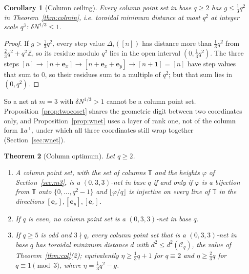 \documentclass[11pt]{amsart}
\newtheorem{theorem}{Theorem}
\newtheorem{corollary}[theorem]{Corollary}
\theoremstyle{definition}
\theoremstyle{plain}
\newcommand{\Z}{\mathbb{Z}}
\newcommand{\e}{\mathbf{e}}
\begin{document}
\begin{corollary}[Column ceiling]\label{cor:colceil}
Every column point set in base $q\ge2$ has $g\le\frac13q^2$ in Theorem~\ref{thm:colmin}, i.e. toroidal minimum distance at most $q^2$ at integer scale $q^3$: $\delta N^{1/3}\le1$.
\end{corollary}

\begin{proof}
If $g>\frac13q^2$, every step value $\Delta_i([n])$ has distance more than $\frac13q^2$ from $\frac23q^2+q^2\Z$, so its residue modulo $q^2$ lies in the open interval $(0,\frac13q^2)$. The three steps $[n]\to[n+\e_x]\to[n+\e_x+\e_y]\to[n+\mathbf 1]=[n]$ have step values that sum to $0$, so their residues sum to a multiple of $q^2$; but that sum lies in $(0,q^2)$.
\end{proof}

So a net at $m=3$ with $\delta N^{1/3}>1$ cannot be a column point set. Proposition~\ref{prop:twocoset} shares the geometric digit between two coordinates only, and Proposition~\ref{prop:wnet} uses a layer of rank one, not of the column form $\mathbf 1a^{\!\top}$, under which all three coordinates still wrap together (Section~\ref{sec:wnet}).

\begin{theorem}[Column optimum]\label{thm:O}
Let $q\ge2$.
\begin{enumerate}
\item A column point set, with the set of columns $\mathbb T$ and the heights $\varphi$ of Section~\ref{sec:m3}, is a $(0,3,3)$-net in base $q$ if and only if $\varphi$ is a bijection from $\mathbb T$ onto $\{0,\dots,q^2-1\}$ and $\lfloor\varphi/q\rfloor$ is injective on every line of $\mathbb T$ in the directions $[\e_x],[\e_y],[\e_z]$.
\item If $q$ is even, no column point set is a $(0,3,3)$-net in base $q$.
\item If $q\ge5$ is odd and $3\nmid q$, every column point set that is a $(0,3,3)$-net in base $q$ has toroidal minimum distance $d$ with $d^2\le d^2(\mathcal C_q)$, the value of Theorem~\ref{thm:col}(2); equivalently $\eta\ge\frac13q+1$ for $q\equiv2$ and $\eta\ge\frac23q$ for $q\equiv1\pmod3$, where $\eta=\frac13q^2-g$.
\end{enumerate}
\end{theorem}
\end{document}

